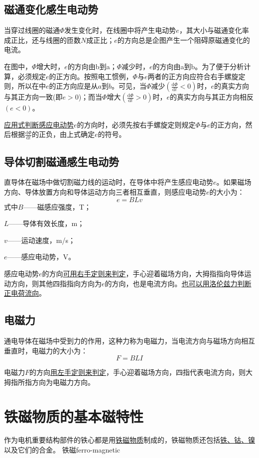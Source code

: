 \documentclass{book}
\begin{document}
\subsection{磁通变化感生电动势}
当穿过线圈的磁通$\Phi $发生变化时，在线圈中将产生电动势$e$，其大小与磁通变化率成正比，还与线圈的匝数$N$成正比；$e$的方向总是企图产生一个阻碍原磁通变化的电流。

在图中，$\Phi $增大时，$e$的方向由b到a；$\Phi $减少时，$e$的方向由a到b。为了便于分析计算，必须规定$e$的正方向。按照电工惯例，$\Phi $与$e$两者的正方向应符合右手螺旋定则，所以在中$e$的正方向应是从$a$到$b$。可见，当$\Phi $减少$\left( \frac{\text{d}\Phi }{\text{d}t}<0 \right)$时，$e$的真实方向与其正方向一致(即$e>0$)；而当$\Phi $增大$\left( \frac{\text{d}\Phi }{\text{d}t}>0 \right)$时，$e$的真实方向与其正方向相反$\left( e<0 \right)$。

\uline{应用式判断感应电动势}$e$的方向时，必须先按右手螺旋定则规定$\Phi $与$e$的正方向，然后根据$\frac{\text{d}\Phi }{\text{d}t}$的正负，由上式确定$e$的符号。
\subsection{导体切割磁通感生电动势}
直导体在磁场中做切割磁力线的运动时，在导体中将产生感应电动势$e$。如果磁场方向、导体放置方向和导体运动方向三者相互垂直，则感应电动势$e$的大小为：
\begin{equation}
e=BLv
\label{eq1.8}	
\end{equation}
式中$B$——磁感应强度，T；

$L$——导体有效长度，m；

$v$——运动速度，m/s；

$e$——感应电动势，V。

感应电动势$e$的方向\uline{可用右手定则来判定}，手心迎着磁场方向，大拇指指向导体运动方向，则其他四指指向方向为$e$的方向，也是电流方向。\uline{也可以用洛伦兹力判断正电荷流向}。
\subsection{电磁力}
通电导体在磁场中受到力的作用，这种力称为电磁力，当电流方向与磁场方向相互垂直时，电磁力的大小为：
\[F=BLI\]

电磁力$F$的方向\uline{用左手定则来判定}，手心迎着磁场方向，四指代表电流方向，则大拇指所指方向为电磁力方向。


\section{铁磁物质的基本磁特性}
作为电机重要结构部件的铁心都是用\uline{铁磁物质}制成的，铁磁物质还包括\uline{铁、钴、镍}以及它们的合金。
铁磁ferro-magnetic
\end{document}
